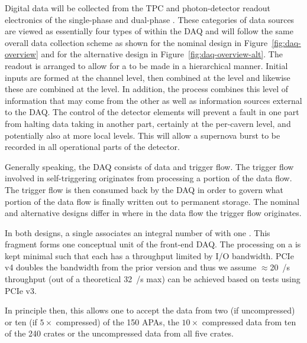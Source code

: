Digital data will be collected from the TPC and photon-detector
readout electronics of the single-phase and dual-phase
. 
These categories of data sources are viewed as essentially four types
of  within the DAQ and will follow the same overall
data collection scheme as shown for the nominal design in
Figure~\ref{fig:daq-overview} and for the alternative design in
Figure~\ref{fig:daq-overview-alt}. 
The readout is arranged to allow for a  to be made
in a hierarchical manner. 
Initial inputs are formed at the channel level, then combined at the
 level and likewise these are combined at the
 level.
In addition, the  process combines this level of
information that may come from the other  as well as
information sources external to the DAQ. 
The control of the detector elements will prevent a fault in one part
from halting data taking in another part, certainly at the per-cavern
level, and potentially also at more local levels. 
This will allow a supernova burst to be recorded in all operational
parts of the detector.

Generally speaking, the DAQ consists of data and trigger flow.
The trigger flow involved in self-triggering originates from
processing a portion of the data flow. 
The trigger flow is then consumed back by the DAQ in order to govern
what portion of the data flow is finally written out to permanent
storage. 
The nominal and alternative designs differ in where in the data flow
the trigger flow originates. 

In both designs, a single  associates an integral
number of  with one .
This fragment forms one conceptual unit of the front-end DAQ.
The processing on a  is kept minimal such that each has a
throughput limited by I/O bandwidth. 
PCIe v4 doubles the bandwidth from the prior version and thus we
assume $\approx$\SI{20}{\GB/\s} throughput (out of a theoretical
\SI{32}{\GB/\s} max) can be achieved based on tests using PCIe v3.

In principle then, this allows one  to accept the data from
two (if uncompressed) or ten (if $5\times$ compressed) of the 150
 APAs, the $10\times$ compressed data from ten of the 240
  crates or the uncompressed data from all five
  crates.

